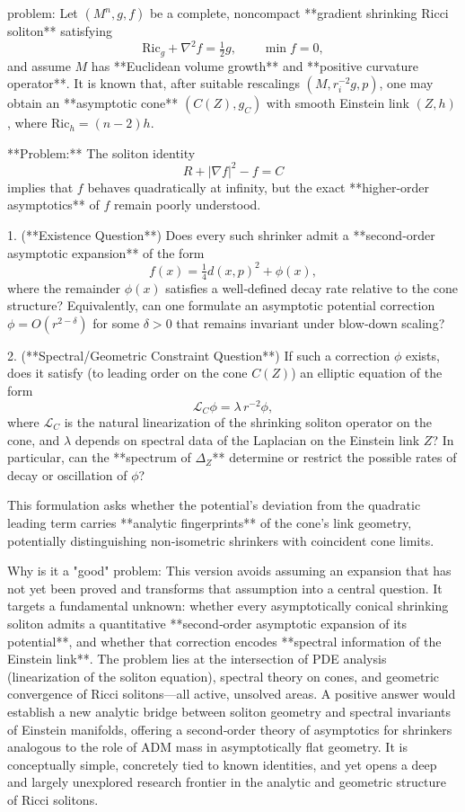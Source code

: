problem:  
Let \((M^n,g,f)\) be a complete, noncompact **gradient shrinking Ricci soliton** satisfying  
\[
\mathrm{Ric}_g + \nabla^2 f = \tfrac{1}{2}g, \qquad \min f = 0,
\]
and assume \(M\) has **Euclidean volume growth** and **positive curvature operator**.  
It is known that, after suitable rescalings \((M,r_i^{-2}g,p)\), one may obtain an **asymptotic cone** \( (C(Z),g_C) \) with smooth Einstein link \( (Z,h) \), where \( \mathrm{Ric}_h = (n-2)h \).

**Problem:**  
The soliton identity  
\[
R + |\nabla f|^2 - f = C
\]
implies that \(f\) behaves quadratically at infinity, but the exact **higher‑order asymptotics** of \(f\) remain poorly understood.  

1. (**Existence Question**)  
Does every such shrinker admit a **second‑order asymptotic expansion** of the form  
\[
f(x) = \tfrac{1}{4} d(x,p)^2 + \phi(x),
\]
where the remainder \(\phi(x)\) satisfies a well‑defined decay rate relative to the cone structure?  
Equivalently, can one formulate an asymptotic potential correction \(\phi = O(r^{2-\delta})\) for some \(\delta>0\) that remains invariant under blow‑down scaling?  

2. (**Spectral/Geometric Constraint Question**)  
If such a correction \(\phi\) exists, does it satisfy (to leading order on the cone \(C(Z)\)) an elliptic equation of the form  
\[
\mathcal{L}_C \phi = \lambda\,r^{-2} \phi,
\]
where \(\mathcal{L}_C\) is the natural linearization of the shrinking soliton operator on the cone, and \(\lambda\) depends on spectral data of the Laplacian on the Einstein link \(Z\)?  
In particular, can the **spectrum of \(\Delta_Z\)** determine or restrict the possible rates of decay or oscillation of \(\phi\)?  

This formulation asks whether the potential’s deviation from the quadratic leading term carries **analytic fingerprints** of the cone’s link geometry, potentially distinguishing non‑isometric shrinkers with coincident cone limits.

Why is it a "good" problem:  
This version avoids assuming an expansion that has not yet been proved and transforms that assumption into a central question. It targets a fundamental unknown: whether every asymptotically conical shrinking soliton admits a quantitative **second‑order asymptotic expansion of its potential**, and whether that correction encodes **spectral information of the Einstein link**.  
The problem lies at the intersection of PDE analysis (linearization of the soliton equation), spectral theory on cones, and geometric convergence of Ricci solitons—all active, unsolved areas.  
A positive answer would establish a new analytic bridge between soliton geometry and spectral invariants of Einstein manifolds, offering a second‑order theory of asymptotics for shrinkers analogous to the role of ADM mass in asymptotically flat geometry.  
It is conceptually simple, concretely tied to known identities, and yet opens a deep and largely unexplored research frontier in the analytic and geometric structure of Ricci solitons.